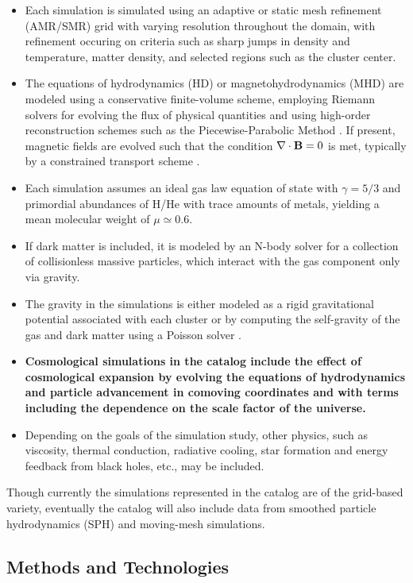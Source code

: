 \documentclass{emulateapj}
\begin{document}
\begin{itemize}
\item Each simulation is simulated using an adaptive or static mesh refinement (AMR/SMR) grid \citep{ber89} with varying resolution throughout the domain, with refinement occuring on criteria such as sharp jumps in density and temperature, matter density, and selected regions such as the cluster center.
\item The equations of hydrodynamics (HD) or magnetohydrodynamics (MHD) are modeled using a conservative finite-volume scheme, employing Riemann solvers for evolving the flux of physical quantities and using high-order reconstruction schemes such as the Piecewise-Parabolic Method \citep[PPM,][]{col84}. If present, magnetic fields are evolved such that the condition $\nabla \cdot {\bf B} = 0$ is met, typically by a constrained transport scheme \citep[CT,][]{eva88}.
\item Each simulation assumes an ideal gas law equation of state with $\gamma = 5/3$ and primordial abundances of H/He with trace amounts of metals, yielding a mean molecular weight of $\mu \simeq 0.6$.
\item If dark matter is included, it is modeled by an N-body solver for a collection of collisionless massive particles, which interact with the gas component only via gravity.
\item The gravity in the simulations is either modeled as a rigid gravitational potential associated with each cluster or by computing the self-gravity of the gas and dark matter using a Poisson solver \citep[e.g.,][]{ric08}.
\item {\bf Cosmological simulations in the catalog include the effect of cosmological expansion by evolving the equations of hydrodynamics and particle advancement in comoving coordinates and with terms including the dependence on the scale factor of the universe.}
\item Depending on the goals of the simulation study, other physics, such as viscosity, thermal conduction, radiative cooling, star formation and energy feedback from black holes, etc., may be included.
\end{itemize}

Though currently the simulations represented in the catalog are of the grid-based variety, eventually the catalog will also include data from smoothed particle hydrodynamics (SPH) and moving-mesh simulations.

\subsection{Methods and Technologies}\label{sec:methods}
\end{document}
